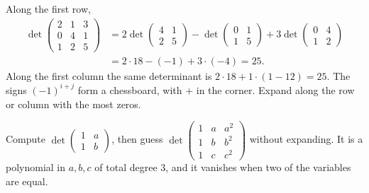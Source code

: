 \begin{examplex}
Along the first row,
\[
\begin{aligned}
\det\begin{pmatrix}2&1&3\\0&4&1\\1&2&5\end{pmatrix}
&=2\det\begin{pmatrix}4&1\\2&5\end{pmatrix}-\det\begin{pmatrix}0&1\\1&5\end{pmatrix}
+3\det\begin{pmatrix}0&4\\1&2\end{pmatrix}\\
&=2\cdot18-(-1)+3\cdot(-4)=25.
\end{aligned}
\]
Along the first column the same determinant is $2\cdot18+1\cdot(1-12)=25$. The signs $(-1)^{i+j}$ form a chessboard, with $+$ in the corner. Expand along the row or column with the most zeros.
\end{examplex}

\begin{think}
Compute $\det\begin{pmatrix}1&a\\1&b\end{pmatrix}$, then guess $\det\begin{pmatrix}1&a&a^2\\1&b&b^2\\1&c&c^2\end{pmatrix}$ without expanding. It is a polynomial in $a,b,c$ of total degree $3$, and it vanishes when two of the variables are equal.
\end{think}

